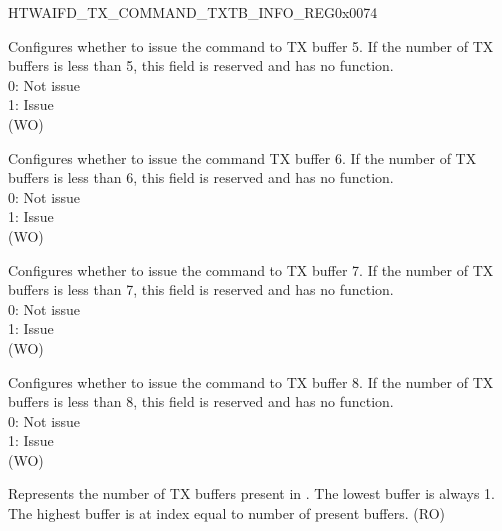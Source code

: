 \addtocounter{Regfloat}{-1}
\begin{register}{H}{TWAIFD\_TX\_COMMAND\_TXTB\_INFO\_REG}{0x0074}
\begin{regdesc}\begin{reglist}
\item [Continued from the previous page...]

\label{fielddesc:TWAIFDTXB5}\item [TWAIFD\_TXB5] Configures whether to issue the command to TX buffer 5. If the number of TX buffers is less than 5, this field is reserved and has no function.\\
0: Not issue\\
1: Issue\\(WO)
\label{fielddesc:TWAIFDTXB6}\item [TWAIFD\_TXB6] Configures whether to issue the command TX buffer 6. If the number of TX buffers is less than 6, this field is reserved and has no function.\\
0: Not issue\\
1: Issue\\(WO)
\label{fielddesc:TWAIFDTXB7}\item [TWAIFD\_TXB7] Configures whether to issue the command to TX buffer 7. If the number of TX buffers is less than 7, this field is reserved and has no function.\\
0: Not issue\\
1: Issue\\(WO)
\label{fielddesc:TWAIFDTXB8}\item [TWAIFD\_TXB8] Configures whether to issue the command to TX buffer 8. If the number of TX buffers is less than 8, this field is reserved and has no function.\\
0: Not issue\\
1: Issue\\(WO)
\label{fielddesc:TWAIFDTXTBUFFERCOUNT}\item [TWAIFD\_TXT\_BUFFER\_COUNT] Represents the number of TX buffers present in \modulename. The lowest buffer is always 1. The highest buffer is at index equal to number of present buffers. (RO)
\end{reglist}\end{regdesc}
\end{register}


